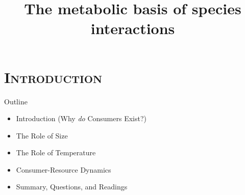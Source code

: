 




{
\begin{frame}[plain]

  \vspace{100pt}
  \title{\bf The metabolic basis of species interactions}

 
\titlepage
\date{} 

\end{frame}
}

\section{\scshape Introduction}

\begin{frame}{Outline}
  \begin{itemize}\setlength{\itemindent}{0em}\itemsep12pt

    \item Introduction (Why {\it do\/} Consumers Exist?)

    \item The Role of Size

    \item The Role of Temperature

    \item Consumer-Resource Dynamics 

    \item Summary, Questions, and Readings

  \end{itemize}  

\end{frame}

